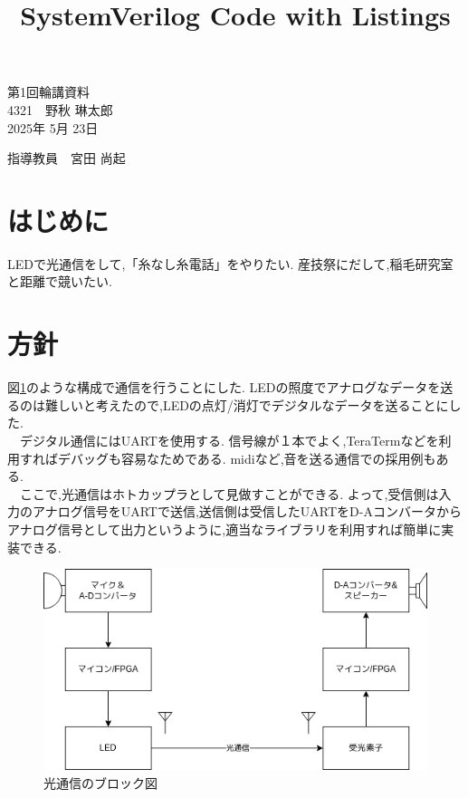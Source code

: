 \documentclass[a4paper,12pt]{article}
\title{SystemVerilog Code with Listings}
\begin{document}
\begin{center}
\noindent
{\LARGE 第1回輪講資料} \\
{\large 4321　野秋 琳太郎} \\
2025年 5月 23日
\end{center}

\begin{flushright}
指導教員　宮田 尚起
\end{flushright}

\begin{multicols}{2}

\section{はじめに}
LEDで光通信をして,「糸なし糸電話」をやりたい.
産技祭にだして,稲毛研究室と距離で競いたい.

\section{方針}
図\ref{fig:block}のような構成で通信を行うことにした.
LEDの照度でアナログなデータを送るのは難しいと考えたので,LEDの点灯/消灯でデジタルなデータを送ることにした.\\
　デジタル通信にはUARTを使用する.
信号線が１本でよく,TeraTermなどを利用すればデバッグも容易なためである.
midiなど,音を送る通信での採用例もある.\\
　ここで,光通信はホトカップラとして見做すことができる.
よって,受信側は入力のアナログ信号をUARTで送信,送信側は受信したUARTをD-Aコンバータからアナログ信号として出力というように,適当なライブラリを利用すれば簡単に実装できる.

\begin{figure}[H] %
  \centering
  \includegraphics[width=\linewidth]{block.drawio.png}
  \caption{光通信のブロック図}
  \label{fig:block}
\end{figure}


\end{multicols}
\end{document}
